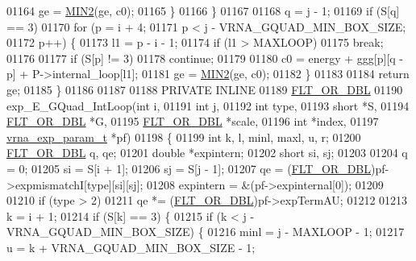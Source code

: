 \begin{DoxyCode}
01164       ge  = \hyperlink{group__utils_gae0b9cd0ce090bd69b951aa73e8fa4f7d}{MIN2}(ge, c0);
01165     \}
01166   \}
01167 
01168   q = j - 1;
01169   \textcolor{keywordflow}{if} (S[q] == 3)
01170     \textcolor{keywordflow}{for} (p = i + 4;
01171          p < j - VRNA\_GQUAD\_MIN\_BOX\_SIZE;
01172          p++) \{
01173       l1 = p - i - 1;
01174       \textcolor{keywordflow}{if} (l1 > MAXLOOP)
01175         \textcolor{keywordflow}{break};
01176 
01177       \textcolor{keywordflow}{if} (S[p] != 3)
01178         \textcolor{keywordflow}{continue};
01179 
01180       c0  = energy + ggg[p][q - p] + P->internal\_loop[l1];
01181       ge  = \hyperlink{group__utils_gae0b9cd0ce090bd69b951aa73e8fa4f7d}{MIN2}(ge, c0);
01182     \}
01183 
01184   \textcolor{keywordflow}{return} ge;
01185 \}
01186 
01187 
01188 PRIVATE INLINE
01189 \hyperlink{group__data__structures_ga31125aeace516926bf7f251f759b6126}{FLT\_OR\_DBL}
01190 exp\_E\_GQuad\_IntLoop(\textcolor{keywordtype}{int}               i,
01191                     \textcolor{keywordtype}{int}               j,
01192                     \textcolor{keywordtype}{int}               type,
01193                     \textcolor{keywordtype}{short}             *S,
01194                     \hyperlink{group__data__structures_ga31125aeace516926bf7f251f759b6126}{FLT\_OR\_DBL}        *G,
01195                     \hyperlink{group__data__structures_ga31125aeace516926bf7f251f759b6126}{FLT\_OR\_DBL}        *scale,
01196                     \textcolor{keywordtype}{int}               *index,
01197                     \hyperlink{group__energy__parameters_structvrna__exp__param__s}{vrna\_exp\_param\_t}  *pf)
01198 \{
01199   \textcolor{keywordtype}{int}         k, l, minl, maxl, u, r;
01200   \hyperlink{group__data__structures_ga31125aeace516926bf7f251f759b6126}{FLT\_OR\_DBL}  q, qe;
01201   \textcolor{keywordtype}{double}      *expintern;
01202   \textcolor{keywordtype}{short}       si, sj;
01203 
01204   q         = 0;
01205   si        = S[i + 1];
01206   sj        = S[j - 1];
01207   qe        = (\hyperlink{group__data__structures_ga31125aeace516926bf7f251f759b6126}{FLT\_OR\_DBL})pf->expmismatchI[type][si][sj];
01208   expintern = &(pf->expinternal[0]);
01209 
01210   \textcolor{keywordflow}{if} (type > 2)
01211     qe *= (\hyperlink{group__data__structures_ga31125aeace516926bf7f251f759b6126}{FLT\_OR\_DBL})pf->expTermAU;
01212 
01213   k = i + 1;
01214   if (S[k] == 3) \{
01215     \textcolor{keywordflow}{if} (k < j - VRNA\_GQUAD\_MIN\_BOX\_SIZE) \{
01216       minl  = j - MAXLOOP - 1;
01217       u     = k + VRNA\_GQUAD\_MIN\_BOX\_SIZE - 1;

\end{DoxyCode}

